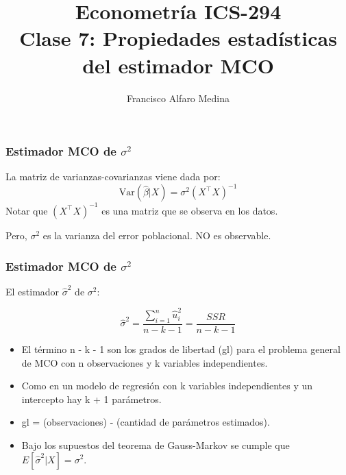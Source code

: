 \documentclass{beamer}
\title[ICS-162]{Econometría ICS-294\\ \small{Clase 7: Propiedades estadísticas del estimador MCO}}
\author{Francisco Alfaro Medina}
\institute[USM]
{Universidad Técnica Federico Santa María\\ %
	\medskip
	\textit{} %
	
}
\date{}
\begin{document}
	
\begin{frame}
	\titlepage %


\end{frame}






\begin{frame}
\frametitle{Estimador MCO de $\sigma^2$}
La matriz de varianzas-covarianzas viene dada por:
\[
\text{Var}(\hat{\beta}|X) = \sigma^2(X^{\top}X)^{-1}
\]
Notar que $(X^{\top}X)^{-1}$ es una matriz que se observa en los datos.

Pero, $\sigma^2$ es la varianza del error poblacional. NO es observable.

\end{frame}

\begin{frame}
\frametitle{Estimador MCO de $\sigma^2$}



El estimador $\hat{\sigma}^2$ de $\sigma^2$:

 $$\hat{\sigma}^2 = \frac{\sum_{i=1}^{n} \hat{u}_i^2 }{n-k-1}= \frac{SSR}{n - k - 1}$$


\begin{itemize}
    \item  El término n - k - 1  son los grados de libertad (gl) para el problema general de
MCO con n observaciones y k variables independientes.
\item  Como en un modelo de regresión con k variables independientes y un intercepto hay k + 1 parámetros.
\item gl =  (observaciones) - (cantidad de parámetros estimados).
\item  Bajo los supuestos del teorema de Gauss-Markov se cumple que $E[\hat{\sigma}^2|X] = \sigma^2$.
\end{itemize}

\end{frame}

    
\end{document}
